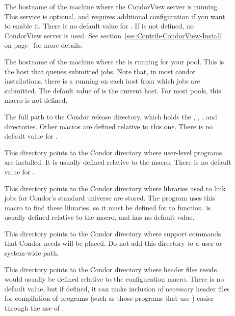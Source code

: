 \begin{description}
\item[] \label{param:CondorViewHost} The
  hostname of the machine where the CondorView server is running.
  This service is optional, and requires additional configuration if
  you want to enable it.  There is no default value for
  .  If  is not
  defined, no CondorView server is used.
  See section~\ref{sec:Contrib-CondorView-Install} on
  page~\pageref{sec:Contrib-CondorView-Install} for more details.

\item[] \label{param:ScheddHost} The
  hostname of the machine where the  is running for
  your pool.  This is the host that queues submitted jobs.  Note that,
  in most condor installations, there is a  running on
  each host from which jobs are submitted.  The default value of
   is the current host.  For most pools, this
  macro is not defined.

\item[] \label{param:ReleaseDir} The full path to
  the Condor release directory, which holds the ,
  , , and  directories.  Other macros
  are defined relative to this one.  There is no default value for
  .

\item[] \label{param:Bin} This directory points to the
  Condor directory where user-level programs are installed.  It is
  usually defined relative to the  macro.
  There is no default value for .
  
\item[] \label{param:Lib} This directory points to the
  Condor directory where libraries used to link jobs for Condor's
  standard universe are stored.  The  program uses
  this macro to find these libraries, so it must be defined for
   to function.   is usually defined
  relative to the  macro, and has no default
  value.

\item[] \label{param:LibExec} This directory points
  to the Condor directory where support commands that Condor
  needs will be placed.
  Do not add this directory to a user or system-wide path.

\item[] \label{param:Include} This directory points
  to the Condor directory where header files reside.
   would usually be defined relative to
  the  configuration macro.
  There is no default value, but
  if defined, it can make inclusion of necessary header files
  for compilation of programs (such as those programs
  that use )
  easier through the use of .


\end{description}
